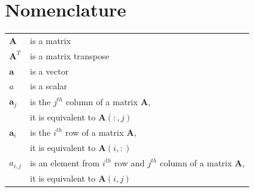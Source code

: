 \documentclass[10pt,twocolumn]{article}
\begin{document}
\section*{Nomenclature}

\begin{tabular}{ll}
    $\bm{A}$ & is a matrix \\
     $\bm{A}^T$ & is a matrix transpose \\
     $\bm{a}$ & is a vector \\
     $a$ & is a scalar \\
    $\bm{a}_j$ & is the $j^{th}$ column of a matrix $\bm{A}$, \\
    & it is equivalent to  $\bm{A}(:,j)$ \\
    $\bm{a}_i$ & is the $i^{th}$ row of a matrix $\bm{A}$, \\
    & it is equivalent to  $\bm{A}(i,:)$ \\
    $a_{i,j}$ & is an element from $i^{th}$ row and $j^{th}$ column of a matrix $\bm{A}$, \\ 
    & it is equivalent to  $\bm{A}(i,j)$ \\
\end{tabular}

%
%
%
%
%
%
%
\end{document}
